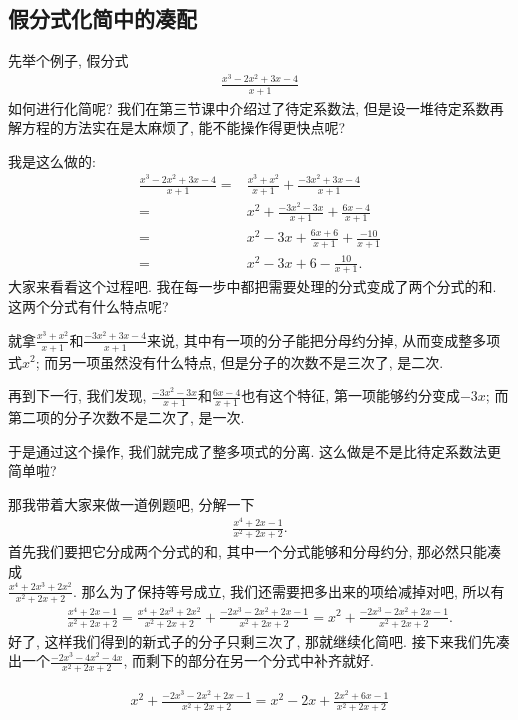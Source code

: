 \documentclass{ctexbook}
\begin{document}
{\subsection{假分式化简中的凑配}
先举个例子, 假分式
\begin{align*}
\frac{x^{3}-2x^{2}+3x-4}{x+1}
\end{align*}
如何进行化简呢? 我们在第三节课中介绍过了待定系数法, 但是设一堆待定系数再解方程的方法实在是太麻烦了, 能不能操作得更快点呢? \par
我是这么做的: 
\begin{align*}
\frac{x^{3}-2x^{2}+3x-4}{x+1}={}&\frac{x^{3}+x^{2}}{x+1}+\frac{-3x^{2}+3x-4}{x+1}\\
={}&x^{2}+\frac{-3x^{2}-3x}{x+1}+\frac{6x-4}{x+1}\\
={}&x^{2}-3x+\frac{6x+6}{x+1}+\frac{-10}{x+1}\\
={}&x^{2}-3x+6-\frac{10}{x+1}
.\end{align*}
大家来看看这个过程吧. 我在每一步中都把需要处理的分式变成了两个分式的和. 这两个分式有什么特点呢? \par
就拿$\frac{x^{3}+x^{2}}{x+1}$和$\frac{-3x^{2}+3x-4}{x+1}$来说, 其中有一项的分子能把分母约分掉, 从而变成整多项式$x^{2}$; 而另一项虽然没有什么特点, 但是分子的次数不是三次了, 是二次. \par
再到下一行, 我们发现, $\frac{-3x^{2}-3x}{x+1}$和$\frac{6x-4}{x+1}$也有这个特征, 第一项能够约分变成$-3x$; 而第二项的分子次数不是二次了, 是一次. \par
于是通过这个操作, 我们就完成了整多项式的分离. 这么做是不是比待定系数法更简单啦? \par
那我带着大家来做一道例题吧, 分解一下
\begin{align*}
\frac{x^{4}+2x-1}{x^{2}+2x+2}
.\end{align*}
首先我们要把它分成两个分式的和, 其中一个分式能够和分母约分, 那必然只能凑成\\$\frac{x^{4}+2x^{3}+2x^{2}}{x^{2}+2x+2}$. 那么为了保持等号成立, 我们还需要把多出来的项给减掉对吧, 所以有
\begin{align*}
\frac{x^{4}+2x-1}{x^{2}+2x+2}=\frac{x^{4}+2x^{3}+2x^{2}}{x^{2}+2x+2}+\frac{-2x^{3}-2x^{2}+2x-1}{x^{2}+2x+2}=x^{2}+\frac{-2x^{3}-2x^{2}+2x-1}{x^{2}+2x+2}
.\end{align*}
好了, 这样我们得到的新式子的分子只剩三次了, 那就继续化简吧. 接下来我们先凑出一个$\frac{-2x^{3}-4x^{2}-4x}{x^{2}+2x+2}$, 而剩下的部分在另一个分式中补齐就好. \par
\begin{align*}
x^{2}+\frac{-2x^{3}-2x^{2}+2x-1}{x^{2}+2x+2}=x^{2}-2x+\frac{2x^{2}+6x-1}{x^{2}+2x+2}

\end{align*}}
\end{document}
